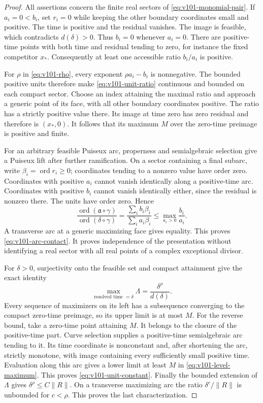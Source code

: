 \begin{proof}
All assertions concern the finite real sectors of
\eqref{eq:v101-monomial-pair}. If $a_i=0<b_i$, set $r_i=0$ while
keeping the other boundary coordinates small and positive. The time
is positive and the residual vanishes. The image is feasible, which
contradicts $d(\delta)>0$. Thus $b_i=0$ whenever $a_i=0$. There are
positive-time points with both time and residual tending to zero,
for instance the fixed competitor $x_*$. Consequently at least one
accessible ratio $b_i/a_i$ is positive.

For $\rho$ in \eqref{eq:v101-rho}, every exponent
$\rho a_i-b_i$ is nonnegative. The bounded positive units therefore
make \eqref{eq:v101-unit-ratio} continuous and bounded on each compact
sector. Choose an index attaining the maximal ratio and approach a
generic point of its face, with all other boundary coordinates positive.
The ratio has a strictly positive value there. Its image at time zero
has zero residual and therefore is $(x_*,0)$. It follows that its
maximum $M$ over the zero-time preimage is positive and finite.

For an arbitrary feasible Puiseux arc, properness and semialgebraic
selection give a Puiseux lift after further ramification. On a sector
containing a final subarc, write $\beta_i=\operatorname{ord}r_i\ge0$;
coordinates tending to a nonzero value have order zero. Coordinates
with positive $a_i$ cannot vanish identically along a positive-time
arc. Coordinates with positive $b_i$ cannot vanish identically either,
since the residual is nonzero there. The units have order zero. Hence
\[
 \frac{\operatorname{ord}(\mathfrak a\circ\gamma)}
      {\operatorname{ord}(\delta\circ\gamma)}
 =\frac{\sum_i b_i\beta_i}{\sum_i a_i\beta_i}
 \le\max_{a_i>0}\frac{b_i}{a_i}.
\]
A transverse arc at a generic maximizing face gives equality. This
proves \eqref{eq:v101-arc-contact}. It proves independence of the
presentation without identifying a real sector with all real points
of a complex exceptional divisor.

For $\delta>0$, surjectivity onto the feasible set and compact attainment
give the exact identity
\begin{equation}\label{eq:v101-level-maximum}
 \max_{\text{resolved time }=\delta}\Lambda
                  =\frac{\delta^\rho}{d(\delta)}.
\end{equation}
Every sequence of maximizers on its left has a subsequence converging
to the compact zero-time preimage, so its upper limit is at most $M$.
For the reverse bound, take a zero-time point attaining $M$. It belongs
to the closure of the positive-time part. Curve selection supplies a
positive-time semialgebraic arc tending to it. Its time coordinate is
nonconstant and, after shortening the arc, strictly monotone, with
image containing every sufficiently small positive time. Evaluation
along this arc gives a lower limit at least $M$ in
\eqref{eq:v101-level-maximum}. This proves
\eqref{eq:v101-unit-constant}. Finally the bounded extension of
$\Lambda$ gives $\delta^\rho\le C\|R\|$. On a transverse maximizing
arc the ratio $\delta^c/\|R\|$ is unbounded for $c<\rho$.
This proves the last characterization.
\end{proof}

